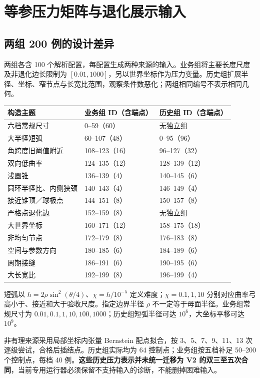 \documentclass[UTF8,zihao=5,fontset=windows,a4paper]{ctexart}
\begin{document}
\newpage
\section{等参压力矩阵与退化展示输入}
\subsection{两组 200 例的设计差异}
两组各含 100 个解析配置，每配置生成两种来源的输入。业务组将主要长度尺度及非退化边长限制为 $[0.01,1000]$，另以世界坐标作为压力变量。历史组扩展半径、坐标、窄节点与长宽比范围，观察条件数恶化；两组相同编号不表示相同几何。
\begin{center}\small\renewcommand{\arraystretch}{1.13}
\begin{tabularx}{\linewidth}{@{}Yp{30mm}p{30mm}@{}}\toprule
构造主题 & 业务组 ID（含端点） & 历史组 ID（含端点）\\\midrule
六档常规尺寸 & 0--59（60） & 无独立组\\
大半径短弧 & 60--107（48） & 0--95（96）\\
角跨度旧阈值附近 & 108--123（16） & 96--127（32）\\
双向低曲率 & 124--135（12） & 128--139（12）\\
浅圆锥 & 136--139（4） & 140--145（6）\\
圆环半径比、内侧狭颈 & 140--143（4） & 146--149（4）\\
接近锥顶／球极点 & 144--151（8） & 150--157（8）\\
严格点退化边 & 152--159（8） & 无独立组\\
大世界坐标 & 160--171（12） & 158--175（18）\\
非均匀节点 & 172--179（8） & 176--183（8）\\
空间与参数方向 & 180--185（6） & 184--189（6）\\
周期接缝 & 186--191（6） & 190--195（6）\\
大长宽比 & 192--199（8） & 196--199（4）\\\bottomrule
\end{tabularx}
\end{center}
短弧以 $h=2\rho\sin^2(\theta/4)$、$\chi=h/10^{-5}$ 定义难度；$\chi=0.1,1,10$ 分别对应曲率弓高小于、接近和大于验收尺度。指定边界半径 $\rho$ 不一定等于母面半径。业务组常规尺寸为 $0.01,0.1,1,10,100,1000$；历史组短弧半径可达 $10^6$，大坐标平移可达 $10^9$。

非有理来源采用局部坐标内张量 Bernstein 配点拟合，按 3、5、7、9、11、13 次逐级尝试，合格后插结点。历史组实际均为 64 控制点；业务组按五档补足 50--200 个控制点，每档 40 例。\textbf{这些历史压力表示并未统一迁移为 V2 的双三至五次合同}，当前专用运行器必须保留不支持输入的诊断，不能删掉困难输入。
\end{document}
